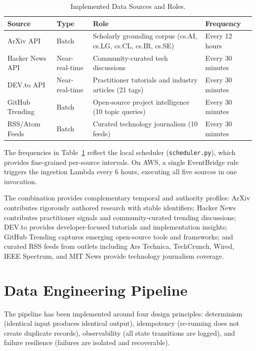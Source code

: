 \begin{table}[H]
\caption{Implemented Data Sources and Roles.}
\label{tab:data_sources}
\centering
\begin{tabular}{p{3.0cm}p{2.5cm}p{4.5cm}p{2.5cm}}
\toprule
\textbf{Source} & \textbf{Type} & \textbf{Role} & \textbf{Frequency} \\
\midrule
ArXiv API & Batch & Scholarly grounding corpus (cs.AI, cs.LG, cs.CL, cs.IR, cs.SE) & Every 12 hours \\
Hacker News API & Near-real-time & Community-curated tech discussions & Every 30 minutes \\
DEV.to API & Near-real-time & Practitioner tutorials and industry articles (21 tags) & Every 30 minutes \\
GitHub Trending & Batch & Open-source project intelligence (10 topic queries) & Every 30 minutes \\
RSS/Atom Feeds & Batch & Curated technology journalism (10 feeds) & Every 30 minutes \\
\bottomrule
\end{tabular}
\end{table}

The frequencies in Table~\ref{tab:data_sources} reflect the local scheduler (\texttt{scheduler.py}), which provides fine-grained per-source intervals. On AWS, a single EventBridge rule triggers the ingestion Lambda every 6 hours, executing all five sources in one invocation.

The combination provides complementary temporal and authority profiles: ArXiv contributes rigorously authored research with stable identifiers; Hacker News contributes practitioner signals and community-curated trending discussions; DEV.to provides developer-focused tutorials and implementation insights; GitHub Trending captures emerging open-source tools and frameworks; and curated RSS feeds from outlets including Ars Technica, TechCrunch, Wired, IEEE Spectrum, and MIT News provide technology journalism coverage.

\section{Data Engineering Pipeline}
\label{sec:pipeline}

The pipeline has been implemented around four design principles: determinism (identical input produces identical output), idempotency (re-running does not create duplicate records), observability (all state transitions are logged), and failure resilience (failures are isolated and recoverable).

